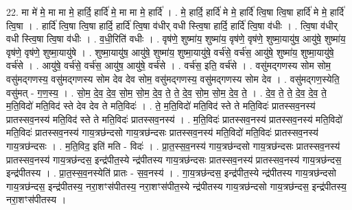 \documentclass[17pt]{extarticle}
\begin{document}
22. मा मे॑ मे॒ मा मा मे॒ हार्दि॒ हार्दि॑ मे॒ मा मा मे॒ हार्दि॑ । . मे॒ हार्दि॒ हार्दि॑ मे मे॒ हार्दि॑ त्वि॒षा त्वि॒षा हार्दि॑ मे मे॒ हार्दि॑ त्वि॒षा । . हार्दि॑ त्वि॒षा त्वि॒षा हार्दि॒ हार्दि॑ त्वि॒षा व॑धीर् वधी स्त्वि॒षा हार्दि॒ हार्दि॑ त्वि॒षा व॑धीः । . त्वि॒षा व॑धीर् वधी स्त्वि॒षा त्वि॒षा व॑धीः । . व॒धी॒रिति॑ वधीः । . वृष॑णे॒ शुष्मा॑य॒ शुष्मा॑य॒ वृष॑णे॒ वृष॑णे॒ शुष्मा॒यायु॑ष॒ आयु॑षे॒ शुष्मा॑य॒ वृष॑णे॒ वृष॑णे॒ शुष्मा॒यायु॑षे । . शुष्मा॒यायु॑ष॒ आयु॑षे॒ शुष्मा॑य॒ शुष्मा॒यायु॑षे॒ वर्च॑से॒ वर्च॑स॒ आयु॑षे॒ शुष्मा॑य॒ शुष्मा॒यायु॑षे॒ वर्च॑से । . आयु॑षे॒ वर्च॑से॒ वर्च॑स॒ आयु॑ष॒ आयु॑षे॒ वर्च॑से । . वर्च॑स॒ इति॒ वर्च॑से । . वसु॑मद्‍गणस्य सोम सोम॒ वसु॑मद्‍गणस्य॒ वसु॑मद्‍गणस्य सोम देव देव सोम॒ वसु॑मद्‍गणस्य॒ वसु॑मद्‍गणस्य सोम देव । . वसु॑मद्‍गण॒स्येति॒ वसु॑मत् - ग॒ण॒स्य॒ । . सो॒म॒ दे॒व॒ दे॒व॒ सो॒म॒ सो॒म॒ दे॒व॒ ते॒ ते॒ दे॒व॒ सो॒म॒ सो॒म॒ दे॒व॒ ते॒ । . दे॒व॒ ते॒ ते॒ दे॒व॒ दे॒व॒ ते॒ म॒ति॒विदो॑ मति॒विद॑ स्ते देव देव ते मति॒विदः॑ । . ते॒ म॒ति॒विदो॑ मति॒विद॑ स्ते ते मति॒विदः॑ प्रातस्सव॒नस्य॑ प्रातस्सव॒नस्य॑ मति॒विद॑ स्ते ते मति॒विदः॑ प्रातस्सव॒नस्य॑ । . म॒ति॒विदः॑ प्रातस्सव॒नस्य॑ प्रातस्सव॒नस्य॑ मति॒विदो॑ मति॒विदः॑ प्रातस्सव॒नस्य॑ गाय॒त्रछ॑न्दसो गाय॒त्रछ॑न्दसः प्रातस्सव॒नस्य॑ मति॒विदो॑ मति॒विदः॑ प्रातस्सव॒नस्य॑ गाय॒त्रछ॑न्दसः । . म॒ति॒विद॒ इति॑ मति - विदः॑ । . प्रा॒त॒स्स॒व॒नस्य॑ गाय॒त्रछ॑न्दसो गाय॒त्रछ॑न्दसः प्रातस्सव॒नस्य॑ प्रातस्सव॒नस्य॑ गाय॒त्रछ॑न्दस॒ इन्द्र॑पीत॒स्ये न्द्र॑पीतस्य गाय॒त्रछ॑न्दसः प्रातस्सव॒नस्य॑ प्रातस्सव॒नस्य॑ गाय॒त्रछ॑न्दस॒ इन्द्र॑पीतस्य । . प्रा॒त॒स्स॒व॒नस्येति॑ प्रातः - स॒व॒नस्य॑ । . गा॒य॒त्रछ॑न्दस॒ इन्द्र॑पीत॒स्ये न्द्र॑पीतस्य गाय॒त्रछ॑न्दसो गाय॒त्रछ॑न्दस॒ इन्द्र॑पीतस्य॒ नरा॒शꣳस॑पीतस्य॒ नरा॒शꣳस॑पीत॒स्ये न्द्र॑पीतस्य गाय॒त्रछ॑न्दसो गाय॒त्रछ॑न्दस॒ इन्द्र॑पीतस्य॒ नरा॒शꣳस॑पीतस्य । \newline
\end{document}
